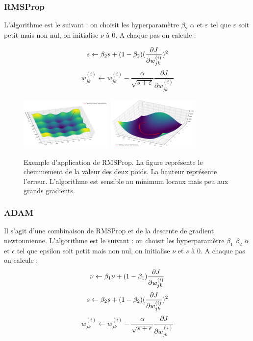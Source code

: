 \subsubsection{RMSProp}
L'algorithme est le suivant : on choisit les hyperparamètre $\beta_2$ $\alpha$ et $\varepsilon$ tel que $\varepsilon$ soit petit mais non nul, on initialise $\nu$ à 0.
A chaque pas on calcule :

\begin{displaymath}
s \leftarrow \beta_2 s + (1-\beta_2)  (\frac{\partial J}{\partial w_{jk}^{(i)}})^2 \\
\end{displaymath}
\begin{displaymath}
w_{jk}^{(i)} \leftarrow w_{jk}^{(i)} - \frac{\alpha}{\sqrt{s+\varepsilon}}\frac{\partial J}{\partial w_{jk}^{(i)}}
\end{displaymath}

\begin{figure}[!h]
\centering
\includegraphics[width=130pt]{"images/MLP/RMSProp"}
\hspace*{10mm}
\includegraphics[width=130pt]{"images/MLP/RMSPropPropre"}
\caption{Exemple d'application de RMSProp. La figure représente le cheminement de la valeur des deux poids. La hauteur représente l'erreur. L'algorithme est sensible au minimum locaux mais peu aux grands gradients.}
\label{RMSProp}
\end{figure}

\subsubsection{ADAM}
Il s'agit d'une combinaison de RMSProp et de la descente de gradient newtonnienne.
L'algorithme est le suivant : on choisit les hyperparamètre $\beta_1$ $\beta_2$  $\alpha$ et $\epsilon$ tel que epsilon soit petit mais non nul, on initialise $\nu$ et $s$ à 0.
A chaque pas on calcule :
\begin{displaymath}
\nu \leftarrow \beta_1 \nu + (1-\beta_1) \frac{\partial J}{\partial w_{jk}^{(i)}} \\
\end{displaymath}
\begin{displaymath}
s \leftarrow \beta_2 s + (1-\beta_2) (\frac{\partial J}{\partial w_{jk}^{(i)}})^2 \\
\end{displaymath}
\begin{displaymath}
w_{jk}^{(i)} \leftarrow w_{jk}^{(i)} - \frac{\alpha}{\sqrt{s+\epsilon}}\frac{\partial J}{\partial w_{jk}^{(i)}}
\end{displaymath}


